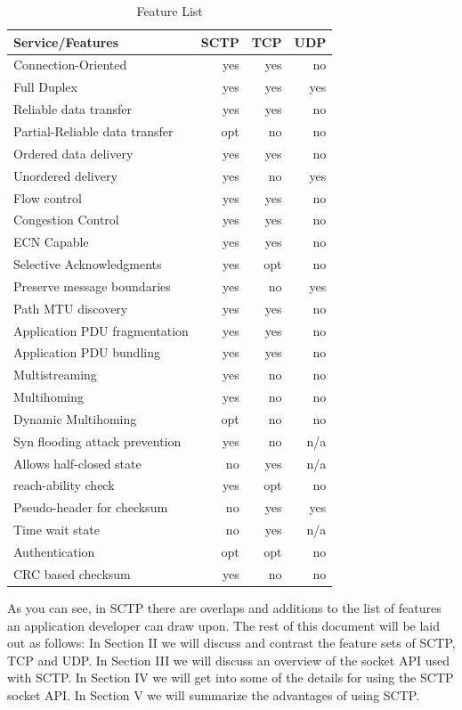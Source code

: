 \documentclass[conference]{IEEEtran}
\begin{document}
\begin{table}
\begin{tabular}{|l|r|r|r|}
 \hline
Service/Features & SCTP & TCP & UDP \\
\hline \hline
Connection-Oriented & yes & yes & no \\
\hline
Full Duplex & yes & yes & yes \\
\hline
Reliable data transfer & yes & yes & no  \\
\hline
Partial-Reliable data transfer & opt & no & no \\
\hline
Ordered data delivery & yes & yes & no \\
\hline
Unordered delivery & yes & no & yes \\
\hline
Flow control & yes & yes & no \\
\hline
Congestion Control & yes & yes & no \\
\hline
ECN Capable & yes & yes & no \\
\hline
Selective Acknowledgments & yes & opt& no \\
\hline
Preserve message boundaries & yes & no & yes \\
\hline
Path MTU discovery & yes & yes & no \\
\hline
Application PDU fragmentation & yes & yes & no \\
\hline
Application PDU bundling & yes & yes & no \\
\hline
Multistreaming & yes & no & no \\
\hline
Multihoming & yes & no & no \\
\hline
Dynamic Multihoming & opt & no & no \\
\hline
Syn flooding attack prevention & yes & no & n/a \\
\hline
Allows half-closed state & no & yes & n/a \\
\hline
reach-ability check & yes & opt & no \\
\hline
Pseudo-header for checksum & no & yes & yes \\
\hline
Time wait state & no & yes & n/a \\
\hline
Authentication & opt & opt  & no \\
\hline
CRC based checksum & yes & no & no \\
\hline
\end{tabular}
\caption{Feature List \label{features}}
\end{table}

As you can see, in SCTP there are overlaps and additions to the list
of features an application developer can draw upon.  The rest of this document will be laid
out as follows: In Section II we will discuss and contrast the feature sets of SCTP, TCP and UDP.
In Section III we will discuss an overview of the socket API used with SCTP. In Section IV we will
get into some of the details for using the SCTP socket API. In Section V we will summarize the
advantages of using SCTP.
\end{document}
